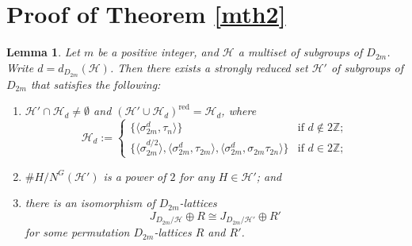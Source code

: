 \documentclass[12pt]{amsart}
\theoremstyle{plain}
\newtheorem{lem}[thm]{Lemma}
\theoremstyle{definition}
\numberwithin{thm}{section}
\numberwithin{equation}{section}
\newcommand{\Z}{\mathbb{Z}}
\newcommand{\cH}{\mathcal{H}}
\DeclareMathOperator{\red}{red}
\begin{document}
\section{Proof of Theorem \ref{mth2}}\label{sect:pfdn}

\begin{lem}\label{lem:dnwl}
Let $m$ be a positive integer, and $\cH$ a multiset of subgroups of $D_{2m}$. Write $d=d_{D_{2m}}(\cH)$. Then there exists a strongly reduced set $\cH'$ of subgroups of $D_{2m}$ that satisfies the following: 
\begin{enumerate}
\item $\cH'\cap \cH_{d}\neq \emptyset$ and $\left(\cH'\cup \cH_{d}\right)^{\red}=\cH_{d}$, where
\begin{equation*}
\cH_{d}:=
\begin{cases}
\{\langle \sigma_{2m}^{d},\tau_{n}\rangle\}&\text{if }d\notin 2\Z;\\
\{\langle \sigma_{2m}^{d/2}\rangle,\langle \sigma_{2m}^{d},\tau_{2m}\rangle,\langle \sigma_{2m}^{d},\sigma_{2m}\tau_{2n}\rangle\}&\text{if }d \in 2\Z;
\end{cases}
\end{equation*}
\item $\#H/N^{G}(\cH')$ is a power of $2$ for any $H\in \cH'$; and
\item there is an isomorphism of $D_{2m}$-lattices
\begin{equation*}
J_{D_{2m}/\cH}\oplus R\cong J_{D_{2m}/\cH'}\oplus R'
\end{equation*}
for some permutation $D_{2m}$-lattices $R$ and $R'$. 
\end{enumerate}
\end{lem}
\end{document}
